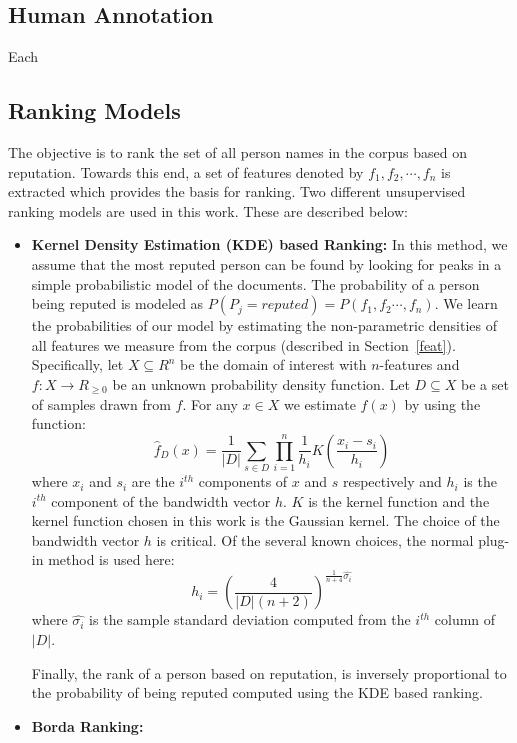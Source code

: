 \documentclass[a4paper,man,natbib]{apa6}
\begin{document}
\subsection{Human Annotation}
Each 

\subsection{Ranking Models}
The objective is to rank the set of all person names in the corpus based on reputation. Towards this end, a set of features denoted by $f_1,f_2, \cdots, f_n$ is extracted which provides the basis for ranking. Two different unsupervised ranking models are used in this work. These are described below:
\begin{itemize}
\item \textbf{Kernel Density Estimation (KDE) based Ranking: } In this method, we assume that the most reputed person can be found by looking for peaks in a simple probabilistic model of the documents. The probability of a person being reputed is modeled as $P(P_j = reputed) = P(f_1,f_2 \cdots, f_n)$. We learn the probabilities of our model by estimating the non-parametric densities \cite{scott_multivariate_2015, Silverman86} of all features we measure from the corpus (described in Section~\ref{feat}). Specifically, let $X \subseteq R^n$ be the domain of interest with $n$-features and $f: X \rightarrow R_{\ge 0}$ be an unknown probability density function. Let $D \subseteq X$ be a set of samples drawn from $f$. For any $x \in X$ we estimate $f(x)$ by using the function:
\begin{equation}
\label{eqn1}
\hat{f}_D(x) = \frac{1}{|D|} \sum_{s \in D} \prod_{i=1}^{n} \frac{1}{h_i} K(\frac{x_i - s_i}{h_i})
\end{equation}
where $x_i$ and $s_i$ are the $i^{th}$ components of $x$ and $s$ respectively and $h_i$ is the $i^{th}$ component of the bandwidth vector $h$. $K$ is the kernel function and the kernel function chosen in this work is the Gaussian kernel. The choice of the bandwidth vector $h$ is critical. Of the several known choices, the normal plug-in method is used here:
\begin{equation}
\label{eqn2}
h_i = (\frac{4}{|D| (n+2)})^{\frac{1}{n+4} \hat{\sigma_i}}
\end{equation}
where $ \hat{\sigma_i}$ is the sample standard deviation computed from the $i^{th}$ column of $|D|$.

Finally, the rank of a person based on reputation, is inversely proportional to the probability of being reputed computed using the KDE based ranking.  
 \item \textbf{Borda Ranking: } 
\end{itemize}
\end{document}

